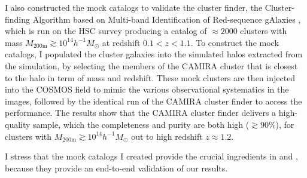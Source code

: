\documentclass{article}
\begin{document}




I also constructed the mock catalogs to validate the cluster finder, the Cluster-finding Algorithm based on Multi-band Identification of Red-sequence gAlaxies \citep[CAMIRA][]{2014MNRAS.444..147O}, which is run on the HSC survey producing a catalog of $\approx 2000$ clusters with mass $M_{200\mathrm{m}} \gtrsim 10^{14} h^{-1}M_{\odot}$ at redshift $0.1<z<1.1$.
To construct the mock catalogs, I populated the cluster galaxies into the simulated halos extracted from the \citet{2010ApJ...709..920S} simulation, by selecting the members of the CAMIRA cluster that is closest to the halo in term of mass and redshift.
These mock clusters are then injected into the COSMOS field to mimic the various observational systematics in the images, followed by the identical run of the CAMIRA cluster finder to access the performance.
The results show that the CAMIRA cluster finder delivers a high-quality sample, which the completeness and purity are both high ($\gtrsim90\%$), for clusters with $M_{200\mathrm{m}} \gtrsim 10^{14} h^{-1}M_{\odot}$ out to high redshift $z\approx1.2$.



I stress that the mock catalogs I created provide the crucial ingredients in \citet{2017ApJ...851..139L} and \citet{2018PASJ...70S..20O}, because they provide an end-to-end validation of our results.
\end{document}
